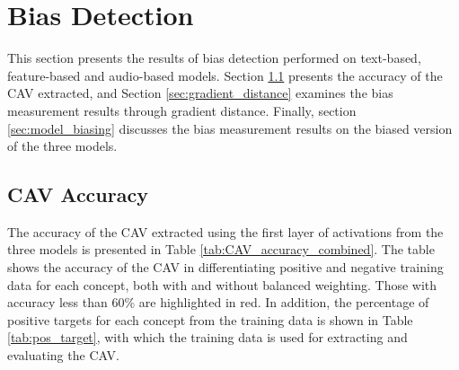 \section{Bias Detection} \label{sec:bias_detection}
This section presents the results of bias detection performed on text-based, feature-based and audio-based models. Section \ref{sec:cav_accuracy} presents the accuracy of the CAV extracted, and Section \ref{sec:gradient_distance} examines the bias measurement results through gradient distance. Finally, section \ref{sec:model_biasing} discusses the bias measurement results on the biased version of the three models.

\subsection{CAV Accuracy} \label{sec:cav_accuracy}
The accuracy of the CAV extracted using the first layer of activations from the three models is presented in Table \ref{tab:CAV_accuracy_combined}. The table shows the accuracy of the CAV in differentiating positive and negative training data for each concept, both with and without balanced weighting. Those with accuracy less than 60\% are highlighted in red. In addition, the percentage of positive targets for each concept from the training data is shown in Table \ref{tab:pos_target}, with which the training data is used for extracting and evaluating the CAV.

